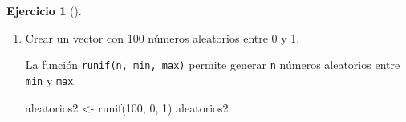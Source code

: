 \documentclass[
  spanish,
  a4paper,
]{scrreport}
\newenvironment{Shaded}{\begin{snugshade}}{\end{snugshade}}
\newcommand{\DecValTok}[1]{\textcolor[rgb]{0.68,0.00,0.00}{#1}}
\newcommand{\FunctionTok}[1]{\textcolor[rgb]{0.28,0.35,0.67}{#1}}
\newcommand{\NormalTok}[1]{\textcolor[rgb]{0.00,0.23,0.31}{#1}}
\newcommand{\OtherTok}[1]{\textcolor[rgb]{0.00,0.23,0.31}{#1}}
\newcommand{\SpecialCharTok}[1]{\textcolor[rgb]{0.37,0.37,0.37}{#1}}
\theoremstyle{definition}
\newtheorem{exercise}{Ejercicio}[chapter]
\theoremstyle{remark}
\begin{document}
\begin{exercise}[]
\begin{enumerate}
\begin{tcolorbox}
  El operador \texttt{\%\%} permite calcular el resto de la división
  entera de dos números. Si el resto es 0, el número es par. Y el
  operador \texttt{==} permite comparar dos vectores elemento a
  elemento.

\begin{Shaded}
\begin{Highlighting}[]
\NormalTok{par }\OtherTok{\textless{}{-}}\NormalTok{ aleatorios }\SpecialCharTok{\%\%} \DecValTok{2} \SpecialCharTok{==} \DecValTok{0}
\NormalTok{par}
\end{Highlighting}
\end{Shaded}

\begin{verbatim}
[1]  TRUE FALSE  TRUE  TRUE FALSE
\end{verbatim}

  \end{tcolorbox}
\item
  Crear un vector con 100 números aleatorios entre 0 y 1.

  \begin{tcolorbox}[enhanced jigsaw, titlerule=0mm, arc=.35mm, rightrule=.15mm, opacitybacktitle=0.6, leftrule=.75mm, colframe=quarto-callout-tip-color-frame, toptitle=1mm, breakable, colbacktitle=quarto-callout-tip-color!10!white, bottomrule=.15mm, colback=white, left=2mm, bottomtitle=1mm, opacityback=0, title=\textcolor{quarto-callout-tip-color}{\faLightbulb}\hspace{0.5em}{Solución}, toprule=.15mm, coltitle=black]

  La función \texttt{runif(n,\ min,\ max)} permite generar \texttt{n}
  números aleatorios entre \texttt{min} y \texttt{max}.

\begin{Shaded}
\begin{Highlighting}[]
\NormalTok{aleatorios2 }\OtherTok{\textless{}{-}} \FunctionTok{runif}\NormalTok{(}\DecValTok{100}\NormalTok{, }\DecValTok{0}\NormalTok{, }\DecValTok{1}\NormalTok{)}
\NormalTok{aleatorios2}
\end{Highlighting}
\end{Shaded}


\end{tcolorbox}
\end{enumerate}
\end{exercise}
\end{document}
